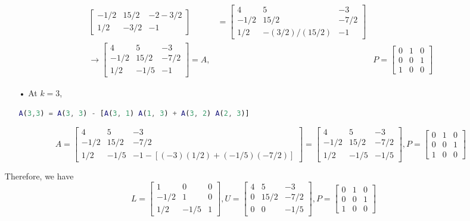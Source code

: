 \documentclass[11pt]{article}
\begin{document}
\begin{enumerate}
\begin{itemize}
\begin{align*}
\begin{bmatrix}
-1/2& 15/2 & -2 -3/2 \\
1/2 & -3/2 & -1
\end{bmatrix} &= \begin{bmatrix}
4 & 5 & -3\\
-1/2& 15/2 & -7/2 \\
1/2 & -(3/2)/(15/2) & -1
\end{bmatrix} \\ \to \begin{bmatrix}
4 & 5 & -3\\
-1/2& 15/2 & -7/2 \\
1/2 & -1/5 & -1
\end{bmatrix} = A ,&& P = \begin{bmatrix}
0 & 1 & 0\\
0 & 0 & 1\\
1& 0 & 0
\end{bmatrix}
\end{align*}
\item[•] At $k=3$,
\begin{lstlisting}[language=matlab]
A(3,3) = A(3, 3) - [A(3, 1) A(1, 3) + A(3, 2) A(2, 3)]
\end{lstlisting}
$$A = \begin{bmatrix}
4 & 5 & -3\\
-1/2& 15/2 & -7/2 \\
1/2 & -1/5 & -1-[(-3)(1/2)+(-1/5)(-7/2)]
\end{bmatrix} = \begin{bmatrix}
4 & 5 & -3\\
-1/2& 15/2 & -7/2 \\
1/2 & -1/5 & -1/5
\end{bmatrix}, P = \begin{bmatrix}
0 & 1 & 0\\
0 & 0 & 1\\
1& 0 & 0
\end{bmatrix}$$
\end{itemize}
Therefore, we have $$L = \begin{bmatrix}
1 &0 & 0\\
-1/2& 1 & 0 \\
1/2 & -1/5 & 1
\end{bmatrix},
U = \begin{bmatrix}
4 & 5 & -3\\
0& 15/2 & -7/2 \\
0 & 0 & -1/5
\end{bmatrix}, P = \begin{bmatrix}
0 & 1 & 0\\
0 & 0 & 1\\
1& 0 & 0
\end{bmatrix}
$$
\end{enumerate}
\end{document}
